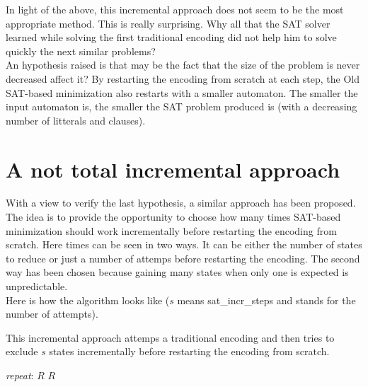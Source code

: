 \noindent In light of the above, this incremental approach does not seem to be the most appropriate method.
This is really surprising. Why all that the SAT solver learned while solving the first traditional encoding
did not help him to solve quickly the next similar problems?\\

An hypothesis raised is that may be the fact that the size of the problem is never decreased affect it? By
restarting the encoding from scratch at each step, the Old SAT-based minimization also restarts with a
smaller automaton. The smaller the input automaton is, the smaller the SAT problem produced is (with a
decreasing number of litterals and clauses).

\section{A not total incremental approach}
\label{approach2}
With a view to verify the last hypothesis, a similar approach has been proposed.
The idea is to provide the opportunity to choose how many times SAT-based
minimization should work incrementally before restarting the encoding from scratch. Here times can be seen
in two ways. It can be either the number of states to reduce or just a number of attemps before
restarting the encoding. The second way has been chosen because gaining many states when only one is
expected is unpredictable.\\

Here is how the algorithm looks like ($s$ means sat\_incr\_steps and stands for the number of attempts).

\begin{algorithm}[H]
 \caption{This incremental approach attemps a traditional encoding and then tries to exclude
          $s$ states incrementally before restarting the encoding from scratch.}
 \label{incr2}
 \begin{algorithmic}[1]
   \BState \emph{repeat}:
    \Return $R$\EndIf
     \Return $R$\EndIf
   \EndFor
  \EndProcedure
 \end{algorithmic}
\end{algorithm}

